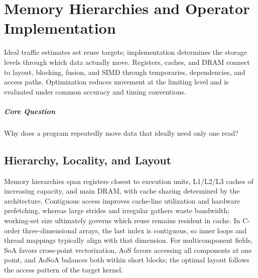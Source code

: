 \chapter{Memory Hierarchies and Operator Implementation}\label{v0ch:26}
\begin{chaptersummary}
Ideal traffic estimates set reuse targets; implementation determines the storage levels through which data actually move. Registers, caches, and DRAM connect to layout, blocking, fusion, and SIMD through temporaries, dependencies, and access paths. Optimization reduces movement at the limiting level and is evaluated under common accuracy and timing conventions.
\end{chaptersummary}
\paragraph{Core Question}Why does a program repeatedly move data that ideally need only one read?

\section{Hierarchy, Locality, and Layout}
Memory hierarchies span registers closest to execution units, L1/L2/L3 caches of increasing capacity, and main DRAM, with cache sharing determined by the architecture. Contiguous access improves cache-line utilization and hardware prefetching, whereas large strides and irregular gathers waste bandwidth; working-set size ultimately governs which reuse remains resident in cache.
In C-order three-dimensional arrays, the last index is contiguous, so inner loops and thread mappings typically align with that dimension. For multicomponent fields, SoA favors cross-point vectorization, AoS favors accessing all components at one point, and AoSoA balances both within short blocks; the optimal layout follows the access pattern of the target kernel.
